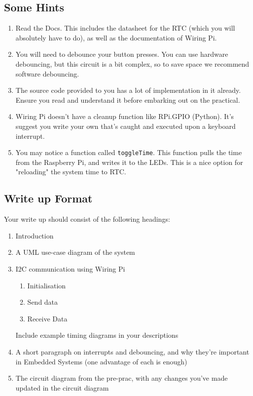 \subsection{Some Hints}
\begin{enumerate}
    \item Read the Docs. This includes the datasheet for the RTC (which you will absolutely have to do), as well as the documentation of Wiring Pi.
    \item You will need to debounce your button presses. You can use hardware debouncing, but this circuit is a bit complex, so to save space we recommend software debouncing.
    \item The source code provided to you has a lot of implementation in it already. Ensure you read and understand it before embarking out on the practical.
    \item Wiring Pi doesn't have a cleanup function like RPi.GPIO (Python). It's suggest you write your own that's caught and executed upon a keyboard interrupt. 
    \item You may notice a function called \verb|toggleTime|. This function pulls the time from the Raspberry Pi, and writes it to the LEDs. This is a nice option for "reloading" the system time to RTC.
\end{enumerate}

\subsection{Write up Format}
Your write up should consist of the following headings:
\begin{enumerate}
    \item Introduction
    \item A UML use-case diagram of the system
    \item I2C communication using Wiring Pi
    \begin{enumerate}
    \item Initialisation
    \item Send data
    \item Receive Data
    \end{enumerate}
    Include example timing diagrams in your descriptions
    \item A short paragraph on interrupts and debouncing, and why they're important in Embedded Systems (one advantage of each is enough)
    \item The circuit diagram from the pre-prac, with any changes you've made updated in the circuit diagram
\end{enumerate}